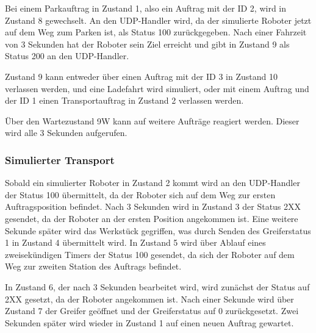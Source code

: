 Bei einem Parkauftrag in Zustand 1, also ein Auftrag mit der ID 2, wird in Zustand 8 gewechselt. An den UDP-Handler wird, da der simulierte Roboter jetzt auf dem Weg zum Parken ist, als Status 100 zurückgegeben. Nach einer Fahrzeit von 3 Sekunden hat der Roboter sein Ziel erreicht und gibt in Zustand 9 als Status 200 an den UDP-Handler. 

Zustand 9 kann entweder über einen Auftrag mit der ID 3 in Zustand 10 verlassen werden, und eine Ladefahrt wird simuliert, oder mit einem Auftrag und der ID 1 einen Transportauftrag in Zustand 2 verlassen werden. 

Über den Wartezustand 9W kann auf weitere Aufträge reagiert werden. Dieser wird alle 3 Sekunden aufgerufen. 

\subsubsection{Simulierter Transport}

Sobald ein simulierter Roboter in Zustand 2 kommt wird an den UDP-Handler der Status 100 übermittelt, da der Roboter sich auf dem Weg zur ersten Auftragsposition befindet. Nach 3 Sekunden wird in Zustand 3 der Status 2XX gesendet, da der Roboter an der ersten Position angekommen ist. Eine weitere Sekunde später wird das Werkstück gegriffen, was durch Senden des Greiferstatus 1 in Zustand 4 übermittelt wird. In Zustand 5 wird über Ablauf eines zweisekündigen Timers der Status 100 gesendet, da sich der Roboter auf dem Weg zur zweiten Station des Auftrags befindet. 

In Zustand 6, der nach 3 Sekunden bearbeitet wird, wird zunächst der Status auf 2XX gesetzt, da der Roboter angekommen ist. Nach einer Sekunde wird über Zustand 7 der Greifer geöffnet und der Greiferstatus auf 0 zurückgesetzt. Zwei Sekunden später wird wieder in Zustand 1 auf einen neuen Auftrag gewartet. 
